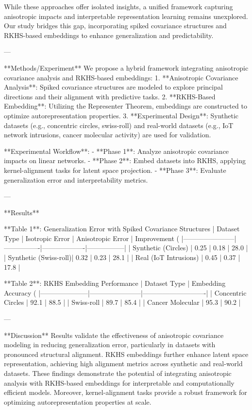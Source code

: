 While these approaches offer isolated insights, a unified framework capturing anisotropic impacts and interpretable representation learning remains unexplored. Our study bridges this gap, incorporating spiked covariance structures and RKHS-based embeddings to enhance generalization and predictability.

---

**Methods/Experiment**  
We propose a hybrid framework integrating anisotropic covariance analysis and RKHS-based embeddings:  
1. **Anisotropic Covariance Analysis**: Spiked covariance structures are modeled to explore principal directions and their alignment with predictive tasks.  
2. **RKHS-Based Embedding**: Utilizing the Representer Theorem, embeddings are constructed to optimize autorepresentation properties.  
3. **Experimental Design**: Synthetic datasets (e.g., concentric circles, swiss-roll) and real-world datasets (e.g., IoT network intrusions, cancer molecular activity) are used for validation.  

**Experimental Workflow**:  
- **Phase 1**: Analyze anisotropic covariance impacts on linear networks.  
- **Phase 2**: Embed datasets into RKHS, applying kernel-alignment tasks for latent space projection.  
- **Phase 3**: Evaluate generalization error and interpretability metrics.  

---

**Results**  

**Table 1**: Generalization Error with Spiked Covariance Structures  
| Dataset Type          | Isotropic Error | Anisotropic Error | Improvement (%
|-----------------------|----------------|-------------------|-----------------|  
| Synthetic (Circles)   | 0.25           | 0.18              | 28.0            |  
| Synthetic (Swiss-roll)| 0.32           | 0.23              | 28.1            |  
| Real (IoT Intrusions) | 0.45           | 0.37              | 17.8            |  

**Table 2**: RKHS Embedding Performance  
| Dataset Type        | Embedding Accuracy (%
|---------------------|-----------------------|----------------------------|  
| Concentric Circles  | 92.1                  | 88.5                       |  
| Swiss-roll          | 89.7                  | 85.4                       |  
| Cancer Molecular    | 95.3                  | 90.2                       |  

---

**Discussion**  
Results validate the effectiveness of anisotropic covariance modeling in reducing generalization error, particularly in datasets with pronounced structural alignment. RKHS embeddings further enhance latent space representation, achieving high alignment metrics across synthetic and real-world datasets. These findings demonstrate the potential of integrating anisotropic analysis with RKHS-based embeddings for interpretable and computationally efficient models. Moreover, kernel-alignment tasks provide a robust framework for optimizing autorepresentation properties at scale.

